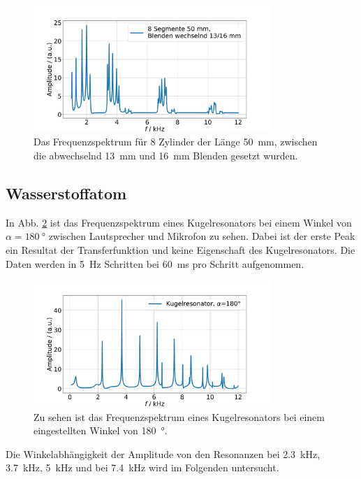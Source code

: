\begin{figure}
    \centering
    \includegraphics[width=0.8\textwidth]{plots/B_6.pdf}
    \caption{Das Frequenzspektrum für 8 Zylinder der Länge \SI{50}{\milli\metre}, zwischen die abwechselnd \SI{13}{\milli\metre} und \SI{16}{\milli\metre} Blenden gesetzt wurden.}
    \label{fig:var5}
\end{figure}

\subsection{Wasserstoffatom}

In Abb. \ref{fig:Wasserstoff1} ist das Frequenzspektrum eines Kugelresonators bei einem Winkel von $\alpha = \SI{180}{\degree}$ zwischen Lautsprecher und Mikrofon zu sehen. Dabei ist der erste Peak ein Resultat der Transferfunktion und keine Eigenschaft des Kugelresonators. 
Die Daten werden in \SI{5}{\hertz} Schritten bei \SI{60}{\milli\second} pro Schritt aufgenommen. 

\begin{figure}
    \centering
    \includegraphics[width=0.8\textwidth]{plots/C_1.pdf}
    \caption{Zu sehen ist das Frequenzspektrum eines Kugelresonators bei einem eingestellten Winkel von \SI{180}{\degree}.}
    \label{fig:Wasserstoff1}
\end{figure}

Die Winkelabhängigkeit der Amplitude von den Resonanzen bei \SI{2.3}{\kilo\hertz}, \SI{3.7}{\kilo\hertz}, \SI{5}{\kilo\hertz} und bei \SI{7.4}{\kilo\hertz} wird im Folgenden untersucht. 

